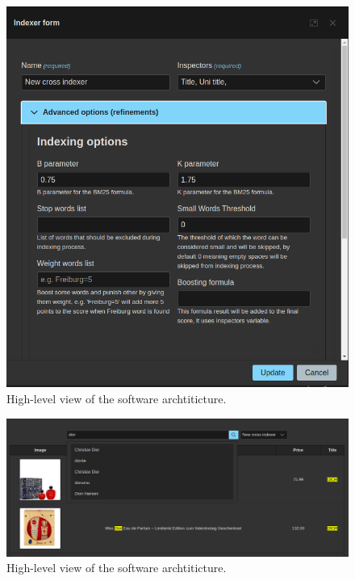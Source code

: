 \begin{figure}[h]	
     \centering
     \includegraphics[width=13cm]{images/demo-11.png}
     \caption{High-level view of the software archtiticture.}
     \label{fig:software-arch}
\end{figure}

\begin{figure}[h]	
     \centering
     \includegraphics[width=13cm]{images/demo-12.png}
     \caption{High-level view of the software archtiticture.}
     \label{fig:software-arch}
\end{figure}
